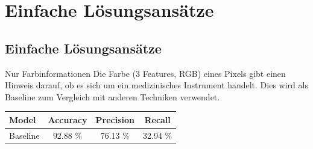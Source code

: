 
\section{Einfache Lösungsansätze}
\subsection{Einfache Lösungsansätze}
\begin{frame}[t]{Nur Farbinformationen}
    Die Farbe (3 Features, RGB) eines Pixels gibt einen Hinweis darauf, ob es
    sich um ein medizinisches Instrument handelt. Dies wird als Baseline zum
    Vergleich mit anderen Techniken verwendet.

    \begin{table}
    \begin{tabular}{lccc}
    \toprule
    \textbf{Model}        & \textbf{Accuracy} & \textbf{Precision} & \textbf{Recall}   \\ \midrule
    Baseline              & 92.88 \%          & 76.13 \%         & 32.94 \% \\
    \end{tabular}
    \end{table}


\end{frame}

